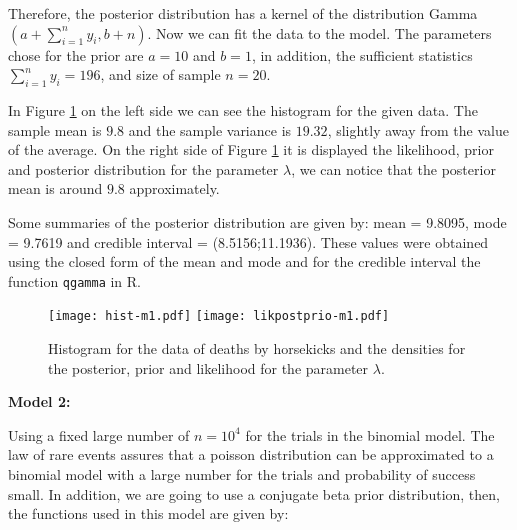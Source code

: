 \documentclass[a4paper, 11pt]{article}
\begin{document}
Therefore, the posterior distribution has a kernel of the distribution Gamma $(a + \sum_{i=1}^{n}y_i,b + n)$. Now we can fit the data to the model. The parameters chose for the prior are $a=10$ and $b=1$, in addition, the sufficient statistics $\sum_{i=1}^{n}y_i = 196$, and size of sample $n=20$. 

In Figure \ref{Fig1tog} on the left side we can see the histogram for the given data. The sample mean is $9.8$ and the sample variance is $19.32$, slightly away from the value of the average. On the right side of Figure \ref{Fig1tog} it is displayed the likelihood, prior and posterior distribution for the parameter $\lambda$, we can notice that the posterior mean is around $9.8$ approximately. 

Some summaries of the posterior distribution are given by: mean = 9.8095, mode = 9.7619 and credible interval = (8.5156;11.1936). These values were obtained using the closed form of the mean and mode and for the credible interval the function \texttt{qgamma} in R.\\ 

\begin{figure}[H]
\centering
\texttt{[image: hist-m1.pdf]}
\texttt{[image: likpostprio-m1.pdf]}
\caption{Histogram for the data of deaths by horsekicks and the densities for the posterior, prior and likelihood for the parameter $\lambda$.}
\label{Fig1tog}
\end{figure}


\noindent
\textbf{Model 2:}

Using a fixed large number of $n=10^4$ for the trials in the binomial model. The law of rare events assures that a poisson distribution can be approximated to a binomial model with a large number for the trials and probability of success small. In addition, we are going to use a conjugate beta prior distribution, then, the functions used in this model are given by: \\
\end{document}
